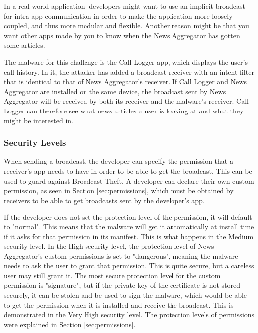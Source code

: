     In a real world application, developers might want to use an implicit broadcast for intra-app communication in order to make the application more loosely coupled, and thus more modular and flexible. Another reason might be that you want other apps made by you to know when the News Aggregator has gotten some articles.

    The malware for this challenge is the Call Logger app, which displays the user's call history. In it, the attacker has added a broadcast receiver with an intent filter that is identical to that of News Aggregator's receiver. If Call Logger and News Aggregator are installed on the same device, the broadcast sent by News Aggregator will be received by both its receiver and the malware's receiver. Call Logger can therefore see what news articles a user is looking at and what they might be interested in.
    
    \subsubsection{Security Levels}
        \label{subsubsec:broadcast_theft_security_levels}
    
    When sending a broadcast, the developer can specify the permission that a receiver's app needs to have in order to be able to get the broadcast. This can be used to guard against Broadcast Theft. A developer can declare their own custom permission, as seen in Section \ref{sec:permissions}, which must be obtained by receivers to be able to get broadcasts sent by the developer's app. 
    
    If the developer does not set the protection level of the permission, it will default to "normal". This means that the malware will get it automatically at install time if it asks for that permission in its manifest. This is what happens in the Medium security level. In the High security level, the protection level of News Aggregator's custom permissions is set to "dangerous", meaning the malware needs to ask the user to grant that permission. This is quite secure, but a careless user may still grant it. The most secure protection level for the custom permission is "signature", but if the private key of the certificate is not stored securely, it can be stolen and be used to sign the malware, which would be able to get the permission when it is installed and receive the broadcast. This is demonstrated in the Very High security level. The protection levels of permissions were explained in Section \ref{sec:permissions}.
    
